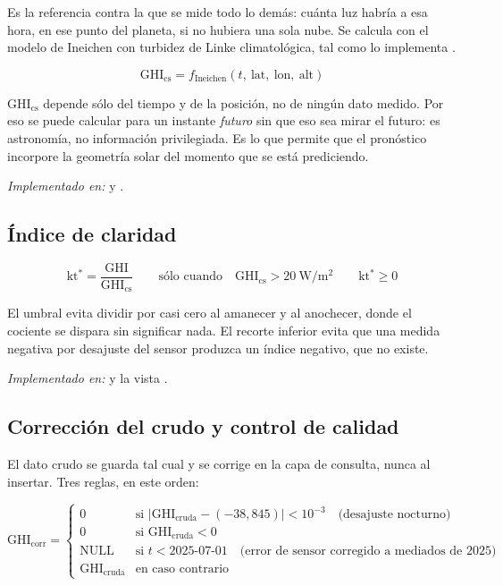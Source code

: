 \documentclass[11pt,a4paper]{article}
\begin{document}
Es la referencia contra la que se mide todo lo demás: cuánta luz habría a esa hora, en
ese punto del planeta, si no hubiera una sola nube. Se calcula con el modelo de Ineichen
con turbidez de Linke climatológica, tal como lo implementa .

\begin{equation*}
  \mathrm{GHI_{cs}} = f_{\text{Ineichen}}(t,\ \text{lat},\ \text{lon},\ \text{alt})
\end{equation*}

\begin{clave}[title=Por qué esto no es hacer trampa]
$\mathrm{GHI_{cs}}$ depende sólo del tiempo y de la posición, no de ningún dato medido.
Por eso se puede calcular para un instante \emph{futuro} sin que eso sea mirar el futuro:
es astronomía, no información privilegiada. Es lo que permite que el pronóstico incorpore
la geometría solar del momento que se está prediciendo.
\end{clave}

\emph{Implementado en:}  y .

\subsection{Índice de claridad}

\begin{equation*}
  \mathrm{kt^*} = \frac{\mathrm{GHI}}{\mathrm{GHI_{cs}}}
  \qquad\text{sólo cuando}\quad \mathrm{GHI_{cs}} > 20\ \mathrm{W/m^2}
  \qquad \mathrm{kt^*} \geq 0
\end{equation*}

El umbral evita dividir por casi cero al amanecer y al anochecer, donde el cociente se
dispara sin significar nada. El recorte inferior evita que una medida negativa por
desajuste del sensor produzca un índice negativo, que no existe.

\emph{Implementado en:}  y la vista .

\subsection{Corrección del crudo y control de calidad}

El dato crudo se guarda tal cual y se corrige en la capa de consulta, nunca al insertar.
Tres reglas, en este orden:

\begin{equation*}
  \mathrm{GHI_{corr}} =
  \begin{cases}
    0 & \text{si } |\mathrm{GHI_{cruda}} - (-38{,}845)| < 10^{-3} \quad\text{(desajuste nocturno)}\\
    0 & \text{si } \mathrm{GHI_{cruda}} < 0 \\
    \text{NULL} & \text{si } t < \text{2025-07-01} \quad\text{(error de sensor corregido a mediados de 2025)}\\
    \mathrm{GHI_{cruda}} & \text{en caso contrario}
  \end{cases}
\end{equation*}
\end{document}
